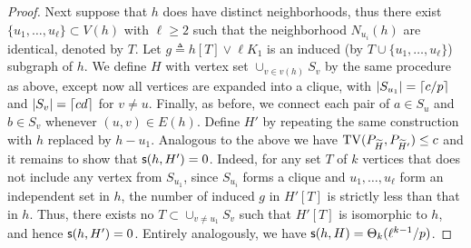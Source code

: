 \begin{proof}
Next suppose that $h$ does have distinct neighborhoods, thus there exist $\{u_1,\ldots,u_\ell\} \subset V(h)$ with $\ell\geq 2$ such that the neighborhood $N_{u_i}(h)$ are identical, denoted by $T$. Let $g \triangleq h[T] \vee \ell K_1$ is an induced (by $T \cup \{u_1,\ldots,u_\ell\}$) subgraph of $h$. We define $H$ with vertex set $\cup_{v \in v(h)} S_v$ by the same procedure as above, except now all vertices are expanded into a clique, with $|S_{u_1}|={\left\lceil {c/p} \right \rceil}$ and 
$|S_v| = {\left\lceil {cd} \right \rceil}$ for $v \neq u$. Finally, as before, we connect each pair of $a \in S_u$ and $b\in S_v$ whenever $(u,v) \in E(h)$. Define $H'$ by repeating the same construction with $h$ replaced by $h-u_1$.
Analogous to the above we have ${\rm TV}(P_{{\widetilde{H}}},P_{{\widetilde{H}}'}) \leq c$ and it remains to show that $\mathsf{s}(h,H')=0$. Indeed, for any set $T$ of $k$ vertices that does not include any vertex from $S_{u_1}$, since $S_{u_i}$ forms a clique and $u_1,\ldots,u_\ell$ form an independent set in $h$, the number of induced $g$ in $H'[T]$ is strictly less than that in $h$. Thus, there exists no $T \subset \cup_{v\neq u_1} S_v$ such that $H'[T]$ is isomorphic to $h$, and hence $\mathsf{s}(h,H')=0$.
Entirely analogously, we have $\mathsf{s}(h,H) = \Theta_k(\ell^{k-1}/p)$. 
\end{proof}

